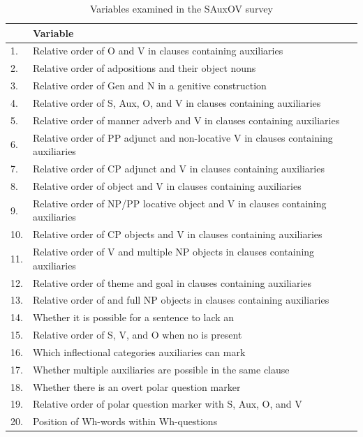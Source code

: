 \documentclass[output=paper,newtxmath,modfonts,nonflat,draftmode]{langsci/langscibook}
\begin{document}
\begin{table}
\caption{Variables examined in the SAuxOV survey} \label{tab:sande:variables} 
\begin{small}
\begin{tabular}{ll}
\lsptoprule
	 & \textbf{Variable}\\
	 \hline
	 1. & Relative order of O and V in clauses containing auxiliaries\\
	 2. & Relative order of adpositions and their object nouns\\
	 3. & Relative order of Gen and N in a genitive construction\\
	 4. & Relative order of S, Aux, O, and V in clauses containing auxiliaries\\
	 5. & Relative order of manner adverb and V in clauses containing auxiliaries\\
	 6. & Relative order of PP adjunct and non-locative V in clauses containing auxiliaries\\
	 7. & Relative order of CP adjunct and V in clauses containing auxiliaries\\
	 8. & Relative order of object \isi{pronoun} and V in clauses containing auxiliaries\\
	 9. & Relative order of NP/PP locative object and V in clauses containing auxiliaries\\
	 10. & Relative order of CP objects and V in clauses containing auxiliaries\\
	 11. & Relative order of V and multiple NP objects in clauses containing auxiliaries\\
	 12. & Relative order of theme and goal in clauses containing auxiliaries\\
	 13. & Relative order of \isi{pronoun} and full NP objects in clauses containing auxiliaries\\
	 14. & Whether it is possible for a sentence to lack an \isi{auxiliary}\\
	 15. & Relative order of S, V, and O when no \isi{auxiliary} is present\\
	 16. & Which inflectional categories auxiliaries can mark\\
	 17. & Whether multiple auxiliaries are possible in the same clause\\
	 18. & Whether there is an overt polar question marker\\
	 19. & Relative order of polar question marker with S, Aux, O, and V\\
	 20. & Position of Wh-words within Wh-questions\\

\end{tabular}
\end{small}
\end{table}
\end{document}
